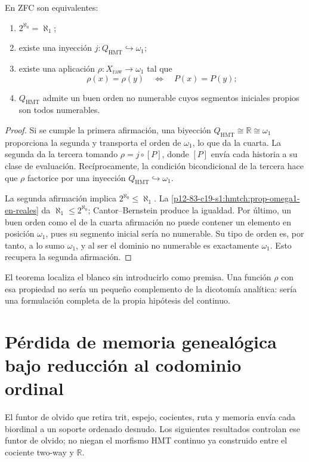 \begin{theorem}
\label{p12-83-c19-s1:hmtch:thm-equivalencias-ch}
En ZFC son equivalentes:
\begin{enumerate}
 \item \(2^{\aleph_0}=\aleph_1\);
 \item existe una inyección \(j:Q_{\mathrm{HMT}}\hookrightarrow\omega_1\);
 \item existe una aplicación \(\rho:X_{\mathrm{raw}}\to\omega_1\) tal que
 \[
  \rho(x)=\rho(y)
  \quad\Longleftrightarrow\quad
  P(x)=P(y);
 \]
 \item \(Q_{\mathrm{HMT}}\) admite un buen orden no numerable cuyos segmentos
 iniciales propios son todos numerables.
\end{enumerate}
\end{theorem}

\begin{proof}
Si se cumple la primera afirmación, una biyección
\(Q_{\mathrm{HMT}}\cong\mathbb R\cong\omega_1\) proporciona la segunda y
transporta el orden de \(\omega_1\), lo que da la cuarta. La segunda da la
tercera tomando \(\rho=j\circ[P]\), donde \([P]\) envía cada historia a su
clase de evaluación. Recíprocamente, la condición bicondicional de la tercera
hace que \(\rho\) factorice por una inyección
\(Q_{\mathrm{HMT}}\hookrightarrow\omega_1\).

La segunda afirmación implica
\(2^{\aleph_0}\leq\aleph_1\). La
\cref{p12-83-c19-s1:hmtch:prop-omega1-en-reales} da
\(\aleph_1\leq2^{\aleph_0}\); Cantor--Bernstein produce la igualdad. Por
último, un buen orden como el de la cuarta afirmación no puede contener un
elemento en posición \(\omega_1\), pues su segmento inicial sería no
numerable. Su tipo de orden es, por tanto, a lo sumo \(\omega_1\), y al ser
el dominio no numerable es exactamente \(\omega_1\). Esto recupera la
segunda afirmación.
\end{proof}

El teorema localiza el blanco sin introducirlo como premisa. Una función
\(\rho\) con esa propiedad no sería un pequeño complemento de la dicotomía
analítica: sería una formulación completa de la propia hipótesis del
continuo.

\section{Pérdida de memoria genealógica bajo reducción al codominio ordinal}

El funtor de olvido que retira trit, espejo, cocientes, ruta y memoria envía
cada biordinal a un soporte ordenado desnudo. Los siguientes resultados
controlan ese funtor de olvido; no niegan el morfismo HMT continuo ya
construido entre el cociente two-way y \(\mathbb R\).

